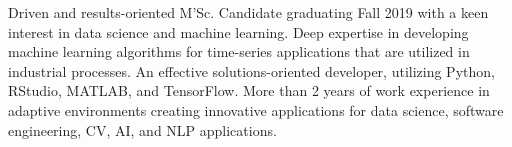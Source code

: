 

\begin{cvparagraph}

Driven and results-oriented M'Sc. Candidate graduating Fall 2019 with a keen interest in data science and machine learning. Deep expertise in developing machine learning algorithms for time-series applications that are utilized in industrial processes. An effective solutions-oriented developer, utilizing Python, RStudio, MATLAB, and TensorFlow. More than 2 years of work experience in adaptive environments creating innovative applications for data science, software engineering, CV, AI, and NLP applications.
\end{cvparagraph}

